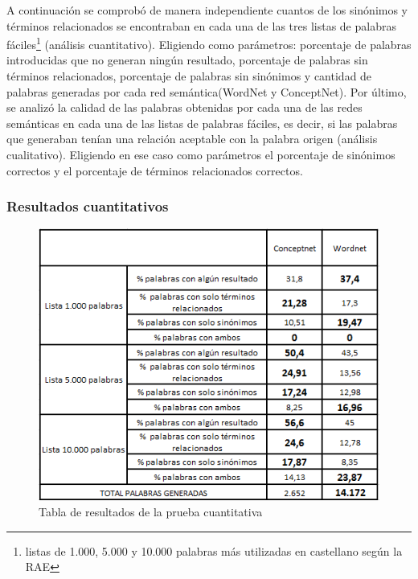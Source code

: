 A continuación se comprobó de manera independiente cuantos de los sinónimos y términos relacionados se encontraban en cada una de las tres listas de palabras fáciles\footnote{listas de 1.000, 5.000 y 10.000 palabras más utilizadas en castellano según la RAE} (análisis cuantitativo). Eligiendo como parámetros: porcentaje de palabras introducidas que no generan ningún resultado, porcentaje de palabras sin términos relacionados, porcentaje de palabras sin sinónimos  y cantidad de palabras generadas por cada red semántica(WordNet y ConceptNet). Por último, se analizó la calidad de las palabras obtenidas por cada una de las redes semánticas en cada una de las listas de palabras fáciles, es decir, si las palabras que generaban tenían una relación aceptable con la palabra origen (análisis cualitativo). Eligiendo en ese caso como parámetros el porcentaje de sinónimos correctos y el porcentaje de términos relacionados correctos.

\subsubsection{Resultados cuantitativos}
\label{cap:sec:pruebaCuantitativa}
\begin{figure}[!h]
\includegraphics[width=.8\textwidth]{Imagenes/Bitmap/Capitulo4/tabla_cuantitativa}
\centering
\caption{Tabla de resultados de la prueba cuantitativa}
\label{fig:tabla_cuantitativa}
\end{figure}


